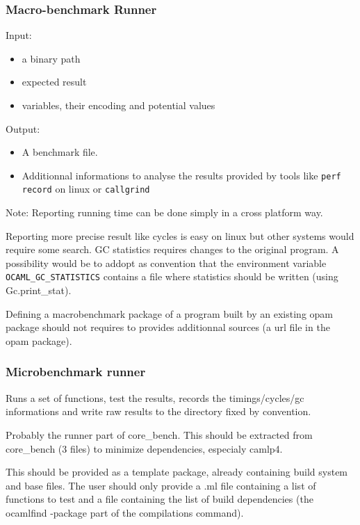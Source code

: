 \documentclass[11pt,a4paper]{article}
\begin{document}
\subsubsection{Macro-benchmark Runner}

Input:
\begin{itemize}
\item a binary path
\item expected result
\item variables, their encoding and potential values
\end{itemize}

Output:
\begin{itemize}
\item A benchmark file.
\item Additionnal informations to analyse the results provided by
  tools like \texttt{perf record} on linux or \texttt{callgrind}
\end{itemize}

Note: Reporting running time can be done simply in a cross platform
way.

Reporting more precise result like cycles is easy on linux but
other systems would require some search. GC statistics requires
changes to the original program. A possibility would be to addopt as
convention that the environment variable
\texttt{OCAML\_GC\_STATISTICS} contains a file where statistics should
be written (using Gc.print\_stat).

Defining a macrobenchmark package of a program built by an existing
opam package should not requires to provides additionnal sources (a
url file in the opam package).

\subsubsection{Microbenchmark runner}

Runs a set of functions, test the results, records the
timings/cycles/gc informations and write raw results to the directory
fixed by convention.

Probably the runner part of core\_bench. This should be extracted from
core\_bench (3 files) to minimize dependencies, especialy camlp4.

This should be provided as a template package, already containing
build system and base files. The user should only provide a .ml file
containing a list of functions to test and a file containing the list
of build dependencies (the ocamlfind -package part of the compilations
command).
\end{document}
